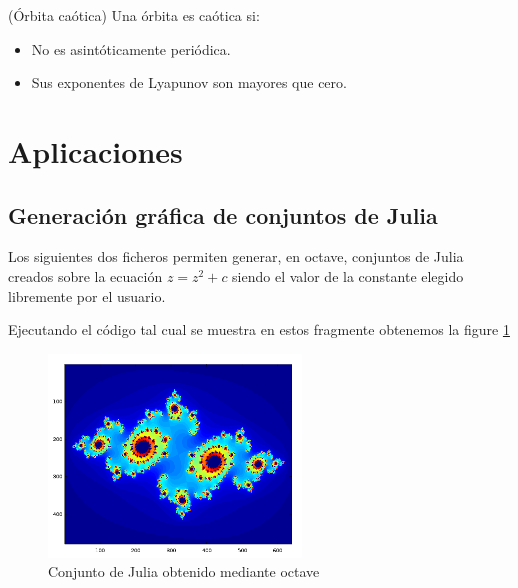 \begin{definition}(Órbita caótica)
Una órbita es caótica si:
\begin{itemize}
\item No es asintóticamente periódica.
\item Sus exponentes de Lyapunov son mayores que cero.
\end{itemize}
\end{definition}




\section{Aplicaciones}
\subsection{Generación gráfica de conjuntos de Julia}
Los siguientes dos ficheros permiten generar, en octave, conjuntos de Julia creados sobre la ecuación $z=z^2+c$ siendo el valor de la constante elegido libremente por el usuario.

%
%

Ejecutando el código tal cual se muestra en estos fragmente obtenemos la figure \ref{fig:JuliaOctave}

\begin{figure}[hbtp]
\centering
\includegraphics[width = 0.6\textwidth]{img/JuliaOctave.png}
\caption{Conjunto de Julia obtenido mediante octave}
\label{fig:JuliaOctave}
\end{figure}

